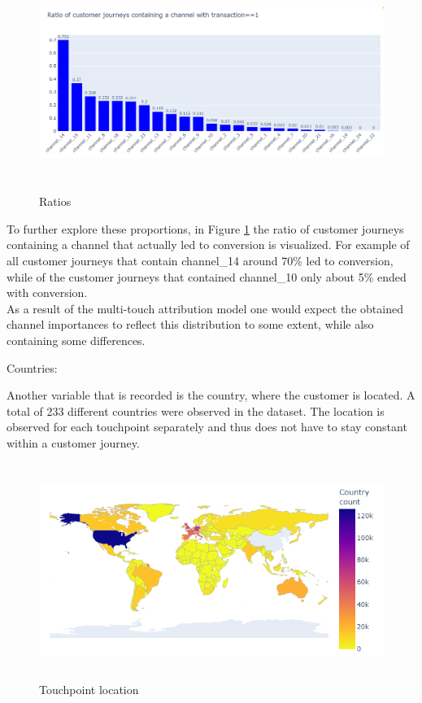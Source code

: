 \begin{figure}[h]
\centering
\includegraphics[height=7cm]{images/ratios_new.png}
\caption{Ratios}
\label{fig:ratio}
\end{figure}

To further explore these proportions, in Figure \ref{fig:ratio} the ratio of customer journeys containing a channel that actually led to conversion is visualized. For example of all customer journeys that contain channel\_14 around 70\% led to conversion, while of the customer journeys that contained channel\_10 only about 5\% ended with conversion. \\
As a result of the multi-touch attribution model one would expect the obtained channel importances to reflect this distribution to some extent, while also containing some differences. \\

\begin{description}
    \item[Countries:]
\end{description}
Another variable that is recorded is the country, where the customer is located. A total of 233 different countries were observed in the dataset. The location is observed for each touchpoint separately and thus does not have to stay constant within a customer journey.

\begin{figure}[h]
\centering
\includegraphics[height=7cm]{images/countrys.png}
\caption{Touchpoint location}
\label{fig:countrys}
\end{figure}

